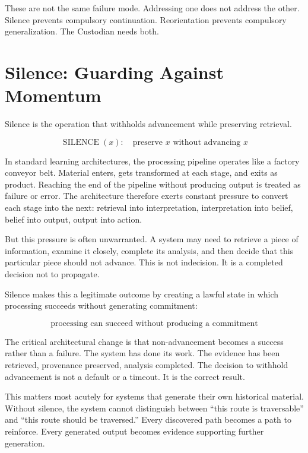 \documentclass[12pt]{article}
\begin{document}
These are not the same failure mode. Addressing one does not address the other. Silence prevents compulsory continuation. Reorientation prevents compulsory generalization. The Custodian needs both.

\section{Silence: Guarding Against Momentum}

Silence is the operation that withholds advancement while preserving retrieval.

\begin{equation}
\operatorname{SILENCE}(x): \quad \text{preserve } x \text{ without advancing } x
\end{equation}

In standard learning architectures, the processing pipeline operates like a factory conveyor belt. Material enters, gets transformed at each stage, and exits as product. Reaching the end of the pipeline without producing output is treated as failure or error. The architecture therefore exerts constant pressure to convert each stage into the next: retrieval into interpretation, interpretation into belief, belief into output, output into action.

But this pressure is often unwarranted. A system may need to retrieve a piece of information, examine it closely, complete its analysis, and then decide that this particular piece should not advance. This is not indecision. It is a completed decision not to propagate.

Silence makes this a legitimate outcome by creating a lawful state in which processing succeeds without generating commitment:

\begin{equation}
\boxed{\text{processing can succeed without producing a commitment}}
\end{equation}

The critical architectural change is that non-advancement becomes a success rather than a failure. The system has done its work. The evidence has been retrieved, provenance preserved, analysis completed. The decision to withhold advancement is not a default or a timeout. It is the correct result.

This matters most acutely for systems that generate their own historical material. Without silence, the system cannot distinguish between ``this route is traversable'' and ``this route should be traversed.'' Every discovered path becomes a path to reinforce. Every generated output becomes evidence supporting further generation.
\end{document}
